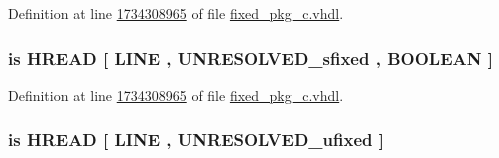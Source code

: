 Definition at line \hyperlink{fixed__pkg__c_8vhdl_source_l1734308965}{1734308965} of file \hyperlink{fixed__pkg__c_8vhdl_source}{fixed\+\_\+pkg\+\_\+c.\+vhdl}.

\hypertarget{classfixed__pkg_aedd687730eae80238d4fa21dc624bad2}{}
\subsubsection[{H\+E\+X\+\_\+\+R\+E\+A\+D}]{ {\bfseries \textcolor{keywordflow}{is}\textcolor{vhdlchar}{ }\textcolor{vhdlchar}{H\+R\+E\+A\+D}\textcolor{vhdlchar}{ }\textcolor{vhdlchar}{\mbox{[}}\textcolor{vhdlchar}{ }\textcolor{vhdlchar}{L\+I\+N\+E}\textcolor{vhdlchar}{ }\textcolor{vhdlchar}{,}\textcolor{vhdlchar}{ }{\bfseries {\bf U\+N\+R\+E\+S\+O\+L\+V\+E\+D\+\_\+sfixed}} \textcolor{vhdlchar}{ }\textcolor{vhdlchar}{,}\textcolor{vhdlchar}{ }\textcolor{comment}{B\+O\+O\+L\+E\+A\+N}\textcolor{vhdlchar}{ }\textcolor{vhdlchar}{\mbox{]}}\textcolor{vhdlchar}{ }} \hspace{0.3cm}{\ttfamily [Alias]}}\label{classfixed__pkg_aedd687730eae80238d4fa21dc624bad2}


Definition at line \hyperlink{fixed__pkg__c_8vhdl_source_l1734308965}{1734308965} of file \hyperlink{fixed__pkg__c_8vhdl_source}{fixed\+\_\+pkg\+\_\+c.\+vhdl}.

\hypertarget{classfixed__pkg_a02b7c0413485701bae192281c6dd4119}{}
\subsubsection[{H\+E\+X\+\_\+\+R\+E\+A\+D}]{ {\bfseries \textcolor{keywordflow}{is}\textcolor{vhdlchar}{ }\textcolor{vhdlchar}{H\+R\+E\+A\+D}\textcolor{vhdlchar}{ }\textcolor{vhdlchar}{\mbox{[}}\textcolor{vhdlchar}{ }\textcolor{vhdlchar}{L\+I\+N\+E}\textcolor{vhdlchar}{ }\textcolor{vhdlchar}{,}\textcolor{vhdlchar}{ }{\bfseries {\bf U\+N\+R\+E\+S\+O\+L\+V\+E\+D\+\_\+ufixed}} \textcolor{vhdlchar}{ }\textcolor{vhdlchar}{\mbox{]}}\textcolor{vhdlchar}{ }} \hspace{0.3cm}{\ttfamily [Alias]}}\label{classfixed__pkg_a02b7c0413485701bae192281c6dd4119}


